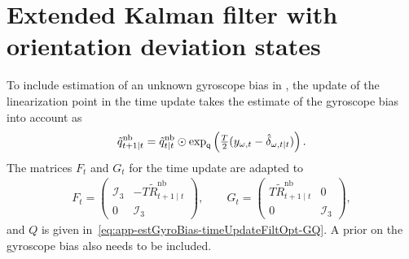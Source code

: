 \section{Extended Kalman filter with orientation deviation states}
To include estimation of an unknown gyroscope bias in , the update of the linearization point in the time update takes the estimate of the gyroscope bias into account as
\begin{align}
\tilde{q}^\text{nb}_{t+1 \mid t} = \tilde{q}^\text{nb}_{t \mid t} \odot \exp_\mathsf{q} \left( \tfrac{T}{2} ( y_{\omega,t} - \hat{\delta}_{\omega,t \mid t} ) \right).
\end{align}
The matrices $F_t$ and $G_t$ for the time update are adapted to 
\begin{align}
F_t = \begin{pmatrix}
\mathcal{I}_3 & -T \tilde{R}_{t+1 \mid t}^{\text{nb}} \\
0 & \mathcal{I}_3
\end{pmatrix}, \qquad  
G_t = \begin{pmatrix} T \tilde{R}_{t+1 \mid t}^{\text{nb}} & 0 \\ 0 & \mathcal{I}_3 \end{pmatrix}, \end{align}
and $Q$ is given in~\eqref{eq:app-estGyroBias-timeUpdateFiltOpt-GQ}. A prior on the gyroscope bias also needs to be included.